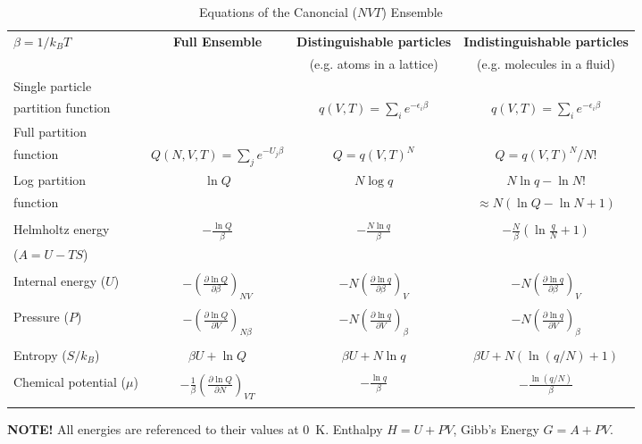 \message{ !name(Outline.tex)}\documentclass[11pt]{article}
\begin{document}
\begin{outline}
\begin{table}\small
  \begin{center}
    \caption{Equations of the Canoncial ($NVT$) Ensemble}
    \label{Canonical}
    \begin{tabular}[h]{lccc}
      \hline
$\beta=1/k_BT$ & {\bf Full Ensemble} & {\bf Distinguishable particles} & {\bf Indistinguishable
particles} \\
               &               & (e.g. atoms in a lattice) & (e.g. molecules in
               a fluid) \\
\hline
Single particle & & & \\partition function& & $\displaystyle q(V,T) = \sum_i
e^{-\epsilon_i\beta} $& $\displaystyle q(V,T) = \sum_i e^{-\epsilon_i\beta} $ \\
Full partition & & & \\function & $\displaystyle Q(N,V,T) = \sum_j e^{-U_j\beta} $ &
$\displaystyle Q = q(V,T)^N $ & $\displaystyle Q = q(V,T)^N/N! $ \\
Log partition &  $\ln Q$ & $N\log q$ & $ N\ln q - \ln N! $\\
function & & & $\approx N(\ln Q - \ln N +1)$ \\ & & & \\
Helmholtz energy & $\displaystyle -\frac{\ln Q}{\beta}$ & $\displaystyle
-\frac{N\ln q}{\beta}$ & $\displaystyle -\frac{N}{\beta}\left (\ln\frac{q}{N} +
  1 \right ) $ \\
($A=U-TS$) & & & \\ & & &  \\
Internal energy ($U$)& $\displaystyle -\left (\frac{\partial\ln
    Q}{\partial\beta}\right )_{NV}$ & $\displaystyle -N\left (\frac{\partial\ln
    q}{\partial\beta}\right )_{V}$ &  $\displaystyle -N\left (\frac{\partial\ln
    q}{\partial\beta}\right )_{V}$ \\ & & & \\
Pressure ($P$) & $\displaystyle -\left (\frac{\partial\ln
    Q}{\partial V}\right )_{N\beta}$ & $\displaystyle -N\left (\frac{\partial\ln
    q}{\partial V}\right )_{\beta}$ &  $\displaystyle -N\left (\frac{\partial\ln
    q}{\partial V}\right )_{\beta}$ \\ & & & \\

Entropy ($S/k_B$) & $ \beta U + \ln Q$ & $\beta U + N \ln q$ & $\beta U +
N\left ( \ln(q/N) + 1\right )$ \\ & & & \\
Chemical potential ($\mu$) & $\displaystyle -\frac{1}{\beta}\left ( \frac{\partial \ln
    Q}{\partial N}\right )_{VT} $& $\displaystyle -\frac{\ln q}{\beta}$ & $\displaystyle
-\frac{\ln (q/N)}{\beta}$ \\ & & & \\
\hline
    \end{tabular}
{\bf NOTE!} All energies are referenced to their values at 0~K.  Enthalpy $H=U+PV$, Gibb's
Energy $G=A+PV$.
  \end{center}
\end{table}


\end{outline}
\end{document}
